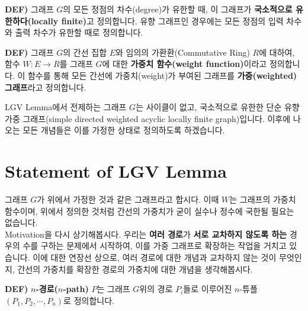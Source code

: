 \documentclass[a4paper]{article}
\begin{document}
\begin{mdframed}
\textbf{DEF)} 그래프 $G$의 모든 정점의 차수(degree)가 유한할 때, 이 그래프가 \textbf{국소적으로 유한하다(locally finite)}고 정의합니다. 유향 그래프인 경우에는 모든 정점의 입력 차수와 출력 차수가 유한할 때로 정의합니다.
\end{mdframed}

\begin{mdframed}
\textbf{DEF)} 그래프 $G$의 간선 집합 $E$와 임의의 가환환(Commutative Ring) $R$에 대하여, 함수 $W : E \rightarrow R$를 그래프 $G$에 대한 \textbf{가중치 함수(weight function)}이라고 정의합니다. 이 함수를 통해 모든 간선에 가중치(weight)가 부여된 그래프를 \textbf{가중(weighted) 그래프}라고 정의합니다.
\end{mdframed}
LGV Lemma에서 전제하는 그래프 $G$는 사이클이 없고, 국소적으로 유한한 단순 유향 가중 그래프(simple directed weighted acyclic locally finite graph)입니다. 이후에 나오는 모든 개념들은 이를 가정한 상태로 정의하도록 하겠습니다.

\newpage
\section{Statement of LGV Lemma}

그래프 $G$가 위에서 가정한 것과 같은 그래프라고 합시다. 이때 $W$는 그래프의 가중치 함수이며, 위에서 정의한 것처럼 간선의 가중치가 굳이 실수나 정수에 국한될 필요는 없습니다.\\
Motivation을 다시 상기해봅시다. 우리는 \textbf{여러 경로}가 \textbf{서로 교차하지 않도록 하는} 경우의 수를 구하는 문제에서 시작하여, 이를 가중 그래프로 확장하는 작업을 거치고 있습니다. 이에 대한 연장선 상으로, 여러 경로에 대한 개념과 교차하지 않는 것이 무엇인지, 간선의 가중치를 확장한 경로의 가중치에 대한 개념을 생각해봅시다.

\begin{mdframed}
\textbf{DEF)} \textbf{$n$-경로($n$-path)} $P$는 그래프 $G$위의 경로 $P_i$들로 이루어진 $n$-튜플 $(P_1, P_2, \cdots, P_n)$로 정의합니다.
\end{mdframed}
\end{document}
